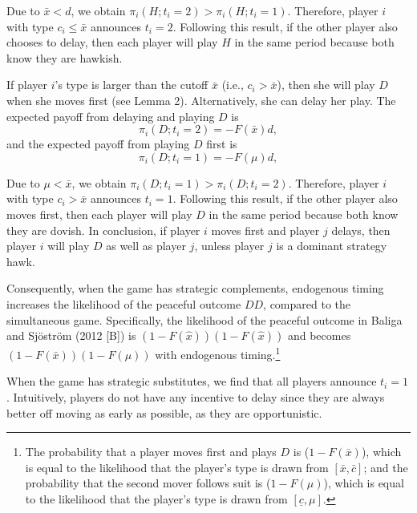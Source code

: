 \documentclass[12pt,english]{article}
\begin{document}
Due to $\bar{x}<d$, we obtain $\pi_i(H;t_i=2)>\pi_i(H;t_i=1)$. Therefore, player $i$ with type $c_i\leq\bar{x}$ announces $t_i=2$. %
Following this result, if the other player also chooses to delay, then each player will play $H$ in the same period because both know they are hawkish. \par
If player $i$'s type is larger than the cutoff $\bar{x}$ (i.e., $c_i> \bar{x}$), then she will play $D$ when she moves first (see Lemma 2). Alternatively, she can delay her play. The expected payoff from delaying and playing $D$ is
\begin{equation}
   \pi_i(D;t_i=2)=-F(\bar{x})d, \label{pidII}
\end{equation}
and the expected payoff from playing $D$ first is
\begin{equation}
    \pi_i(D;t_i=1)=-F(\mu)d, \label{pidI}
\end{equation}\par
Due to $\mu<\bar{x}$, we obtain $\pi_i(D;t_i=1)>\pi_i(D;t_i=2)$. Therefore, player $i$ with type $c_i>\bar{x}$ announces $t_i=1$. %
Following this result, if the other player also moves first, then each player will play $D$ in the same period because both know they are dovish. In conclusion, if player $i$ moves first and player $j$ delays, then player $i$ will play $D$ as well as player $j$, unless player $j$ is a dominant strategy hawk. \par

Consequently, when the game has strategic complements, endogenous timing increases the likelihood of the peaceful outcome $DD$, compared to the simultaneous game. Specifically, the likelihood of the peaceful outcome in Baliga and Sj\"ostr\"om (2012 [B]) is $(1-F(\hat{x}))(1-F(\hat{x}))$ and becomes $(1-F(\bar{x}))(1-F(\mu))$ with endogenous timing.\footnote{The probability that a player moves first and plays $D$ is ($1-F(\bar{x})$), which is equal to the likelihood that the player's type is drawn from $[\bar{x}, \bar{c}]$; and the probability that the second mover follows suit is ($1-F(\mu)$), which is equal to the likelihood that the player's type is drawn from $[\underline{c}, \mu]$.}\par

When the game has strategic substitutes, we find that all players announce $t_i=1$. Intuitively, players do not have any incentive to delay since they are always better off moving as early as possible, as they are opportunistic.\par
\end{document}
